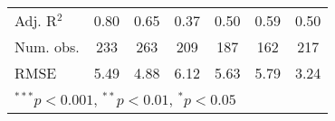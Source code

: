 \documentclass[12pt]{article}
\begin{document}
\begin{table}
\begin{center}
\begin{tabular}{l c c c c c c }
			Adj. R$^2$             & 0.80           & 0.65         & 0.37          & 0.50         & 0.59          & 0.50          \\
			Num. obs.              & 233            & 263          & 209           & 187          & 162           & 217           \\
			RMSE                   & 5.49           & 4.88         & 6.12          & 5.63         & 5.79          & 3.24          \\
			\hline
			\multicolumn{7}{l}{\scriptsize{$^{***}p<0.001$, $^{**}p<0.01$, $^*p<0.05$}}
		\end{tabular}
	\end{center}
\end{table}
\end{document}
